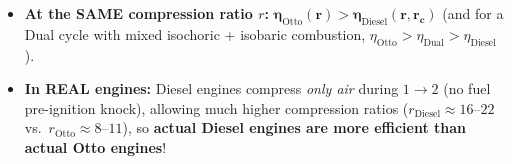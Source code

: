 \begin{formulacard}
\begin{enumerate}
  \begin{itemize}
    \item \textbf{At the SAME compression ratio $r$:} $\mathbf{\eta_{\mathrm{Otto}}(r) > \eta_{\mathrm{Diesel}}(r, r_c)}$ (and for a Dual cycle with mixed isochoric + isobaric combustion, $\eta_{\mathrm{Otto}} > \eta_{\mathrm{Dual}} > \eta_{\mathrm{Diesel}}$).
    \item \textbf{In REAL engines:} Diesel engines compress \emph{only air} during $1\to 2$ (no fuel pre-ignition knock), allowing much higher compression ratios ($r_{\mathrm{Diesel}} \approx 16\text{--}22$ vs.\ $r_{\mathrm{Otto}} \approx 8\text{--}11$), so \textbf{actual Diesel engines are more efficient than actual Otto engines}!
  \end{itemize}
\end{enumerate}
\end{formulacard}

